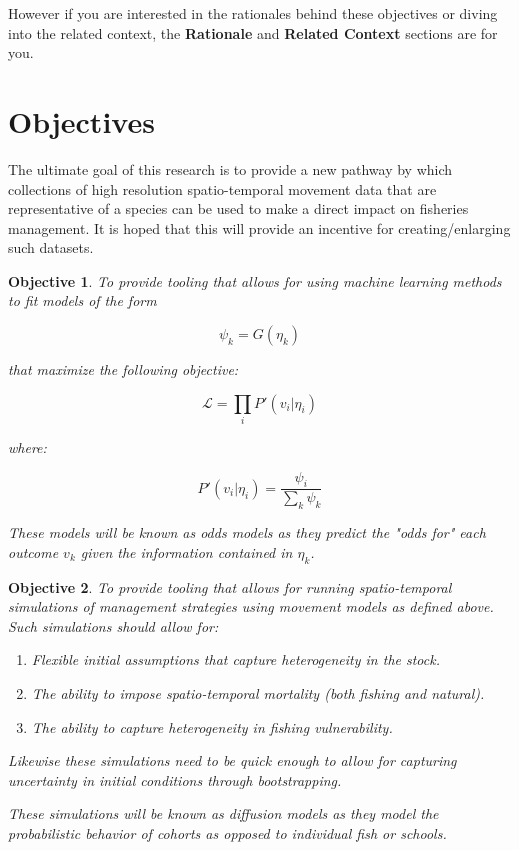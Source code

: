 \documentclass[11pt]{article}
\newtheorem{objective}{Objective}
\begin{document}
However if you are interested in the rationales behind these objectives or diving into the related context, the \textbf{Rationale} and \textbf{Related Context} sections are for you. 

\newpage


\tableofcontents
\newpage

\section{Objectives}

The ultimate goal of this research is to provide a new pathway by which collections of high resolution spatio-temporal movement data that are representative of a species can be used to make a direct impact on fisheries management. It is hoped that this will provide an incentive for creating/enlarging such datasets. 

\begin{objective}
To provide tooling that allows for using machine learning methods to fit models of the form

$$\psi_k = G(\eta_k)$$

that maximize the following objective:


$$\mathcal{L}=\prod_i P'(v_i | \eta_i)$$

where:

$$P'(v_i|\eta_i) = \frac{\psi_i}{\sum_k \psi_k}$$

These models will be known as odds models as they predict the "odds for" each outcome $v_k$ given the information contained in $\eta_k$. 

\end{objective}

\begin{objective}
To provide tooling that allows for running spatio-temporal simulations of management strategies using movement models as defined above. Such simulations should allow for:

\begin{enumerate}
\item Flexible initial assumptions that capture heterogeneity in the stock.
\item The ability to impose spatio-temporal mortality (both fishing and natural).
\item The ability to capture heterogeneity in fishing vulnerability.
\end{enumerate}

Likewise these simulations need to be quick enough to allow for capturing uncertainty in initial conditions through bootstrapping.\newline

These simulations will be known as diffusion models as they model the probabilistic behavior of cohorts as opposed to individual fish or schools. 
\end{objective}
\end{document}
